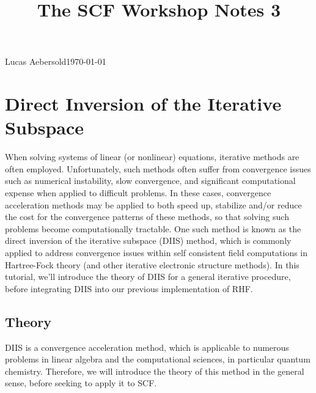 \documentclass[11pt]{article}
\begin{document}
\title{The SCF Workshop Notes 3}{Lucas Aebersold}{\today}
\setcounter{section}{2}
\section{Direct Inversion of the Iterative Subspace}

When solving systems of linear (or nonlinear) equations, iterative methods are often employed.  Unfortunately, such methods often suffer from convergence issues such as numerical instability, slow convergence, and significant computational expense when applied to difficult problems.  In these cases, convergence acceleration methods may be applied to both speed up, stabilize and/or reduce the cost for the convergence patterns of these methods, so that solving such problems become computationally tractable.  One such method is known as the direct inversion of the iterative subspace (DIIS) method, which is commonly applied to address convergence issues within self consistent field computations in Hartree-Fock theory (and other iterative electronic structure methods).  In this tutorial, we'll introduce the theory of DIIS for a general iterative procedure, before integrating DIIS into our previous implementation of RHF.

\subsection{Theory}

DIIS is a convergence acceleration method, which is applicable to numerous problems in linear algebra and the computational sciences, in particular quantum chemistry. Therefore, we will introduce the theory of this method in the general sense, before seeking to apply it to SCF.  
\end{document}
